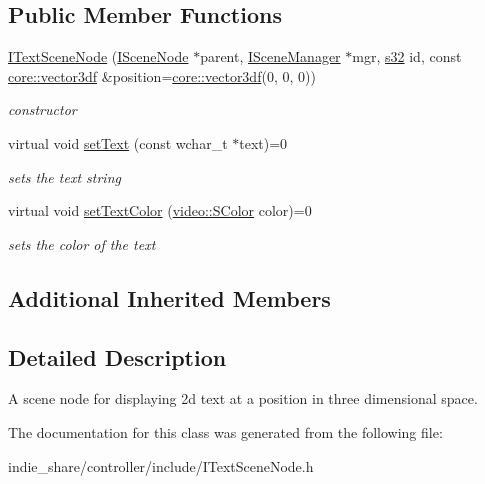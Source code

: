 \subsection*{Public Member Functions}
\begin{DoxyCompactItemize}
\item 
\mbox{\label{classirr_1_1scene_1_1ITextSceneNode_a097623c669cd0401693de8716565d73f}} 
\hyperlink{classirr_1_1scene_1_1ITextSceneNode_a097623c669cd0401693de8716565d73f}{I\+Text\+Scene\+Node} (\hyperlink{classirr_1_1scene_1_1ISceneNode}{I\+Scene\+Node} $\ast$parent, \hyperlink{classirr_1_1scene_1_1ISceneManager}{I\+Scene\+Manager} $\ast$mgr, \hyperlink{namespaceirr_ac66849b7a6ed16e30ebede579f9b47c6}{s32} id, const \hyperlink{namespaceirr_1_1core_a06f169d08b5c429f5575acb7edbad811}{core\+::vector3df} \&position=\hyperlink{namespaceirr_1_1core_a06f169d08b5c429f5575acb7edbad811}{core\+::vector3df}(0, 0, 0))
\begin{DoxyCompactList}\small\item\em constructor \end{DoxyCompactList}\item 
\mbox{\label{classirr_1_1scene_1_1ITextSceneNode_a398822c1a3ca68bbd171ab1534d69aa2}} 
virtual void \hyperlink{classirr_1_1scene_1_1ITextSceneNode_a398822c1a3ca68bbd171ab1534d69aa2}{set\+Text} (const wchar\+\_\+t $\ast$text)=0
\begin{DoxyCompactList}\small\item\em sets the text string \end{DoxyCompactList}\item 
\mbox{\label{classirr_1_1scene_1_1ITextSceneNode_af1d914bc036c54e060b1673e922083dd}} 
virtual void \hyperlink{classirr_1_1scene_1_1ITextSceneNode_af1d914bc036c54e060b1673e922083dd}{set\+Text\+Color} (\hyperlink{classirr_1_1video_1_1SColor}{video\+::\+S\+Color} color)=0
\begin{DoxyCompactList}\small\item\em sets the color of the text \end{DoxyCompactList}\end{DoxyCompactItemize}
\subsection*{Additional Inherited Members}


\subsection{Detailed Description}
A scene node for displaying 2d text at a position in three dimensional space. 

The documentation for this class was generated from the following file\+:\begin{DoxyCompactItemize}
\item 
indie\+\_\+share/controller/include/I\+Text\+Scene\+Node.\+h\end{DoxyCompactItemize}
